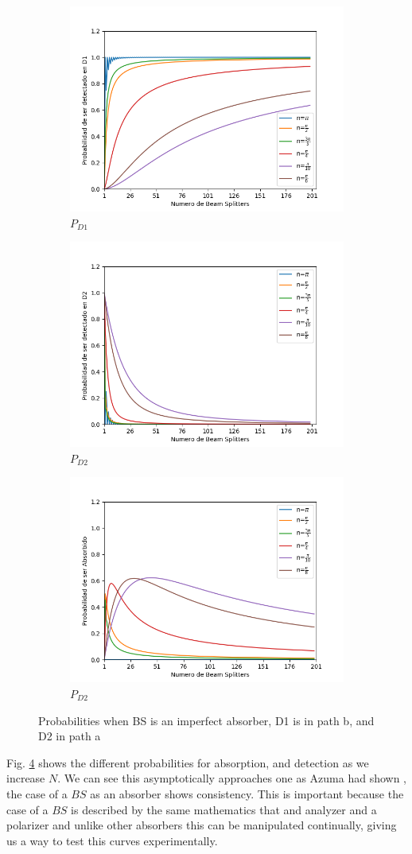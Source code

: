 \documentclass[12pt]{article}
\begin{document}
 
\begin{figure}[h]
\centering
\begin{subfigure}[b]{0.3\linewidth}
\includegraphics[width=\linewidth,height=5 cm]{images/BS_Azuna.png}
\caption{$P_{D1}$}
\label{fig:BS1}
\end{subfigure}
\begin{subfigure}[b]{0.3\linewidth}
\includegraphics[width=\linewidth,height=5 cm]{images/BS_AzunaD2.png}
\caption{$P_{D2}$}
\label{fig:westminster_aerea}
\end{subfigure}
\begin{subfigure}[b]{0.3\linewidth}
\includegraphics[width=\linewidth,height=5 cm]{images/absorbido_azuna.png}
\caption{$P_{D2}$}
\label{fig:BS1}
\end{subfigure}
\caption{Probabilities when BS is an imperfect absorber, D1 is in path b, and D2 in path a}
\label{Bs n imperfect}
\end{figure} 


Fig. \ref{Bs n imperfect} shows the different probabilities for absorption, and detection as we increase $N$. We can see this asymptotically approaches one as Azuma had shown \cite{Azuma}, the case of a $BS$ as an absorber shows consistency. This is important because the case of a $BS$ is described by the same mathematics that and analyzer and a polarizer \cite{Leonhardt_2003} and unlike other absorbers this can be manipulated continually, giving us a way to test this curves experimentally.
 
\end{document}
